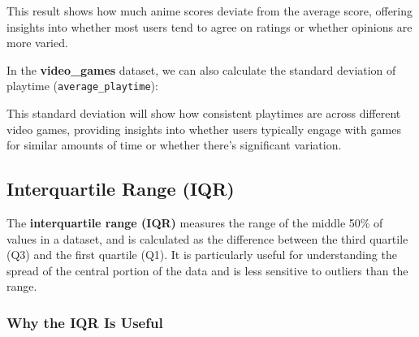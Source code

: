 \documentclass[
]{book}
\newenvironment{Shaded}{\begin{snugshade}}{\end{snugshade}}
\newcommand{\AttributeTok}[1]{\textcolor[rgb]{0.13,0.29,0.53}{#1}}
\newcommand{\CommentTok}[1]{\textcolor[rgb]{0.56,0.35,0.01}{\textit{#1}}}
\newcommand{\ConstantTok}[1]{\textcolor[rgb]{0.56,0.35,0.01}{#1}}
\newcommand{\FunctionTok}[1]{\textcolor[rgb]{0.13,0.29,0.53}{\textbf{#1}}}
\newcommand{\NormalTok}[1]{#1}
\newcommand{\OtherTok}[1]{\textcolor[rgb]{0.56,0.35,0.01}{#1}}
\newcommand{\SpecialCharTok}[1]{\textcolor[rgb]{0.81,0.36,0.00}{\textbf{#1}}}
\begin{document}
\begin{Shaded}
\end{Shaded}

This result shows how much anime scores deviate from the average score, offering insights into whether most users tend to agree on ratings or whether opinions are more varied.

In the \textbf{video\_games} dataset, we can also calculate the standard deviation of playtime (\texttt{average\_playtime}):

\begin{Shaded}
\end{Shaded}

This standard deviation will show how consistent playtimes are across different video games, providing insights into whether users typically engage with games for similar amounts of time or whether there's significant variation.

\subsection*{Interquartile Range (IQR)}\label{interquartile-range-iqr}

The \textbf{interquartile range (IQR)} measures the range of the middle 50\% of values in a dataset, and is calculated as the difference between the third quartile (Q3) and the first quartile (Q1). It is particularly useful for understanding the spread of the central portion of the data and is less sensitive to outliers than the range.

\subsubsection*{Why the IQR Is Useful}\label{why-the-iqr-is-useful}
\end{document}
